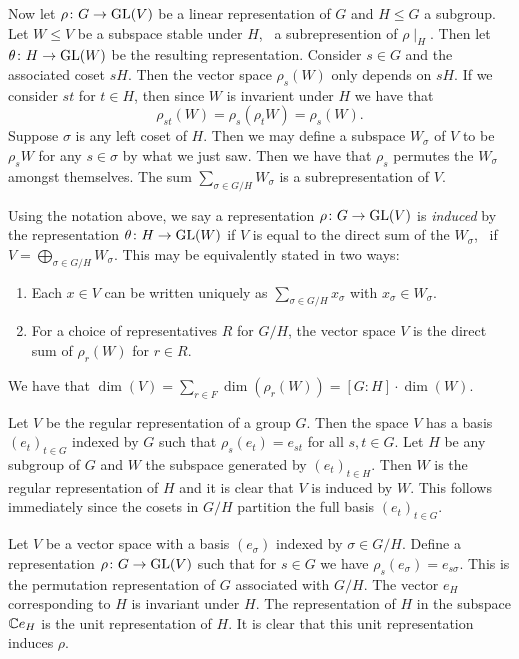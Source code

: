 \documentclass[letterpaper, 11pt, oneside]{book}
\begin{document}
Now let $\rho\colon G \to \operatorname{GL}(V)$ be a linear representation of $G$ and $H \leq G$ a subgroup.
Let $W \leq V$ be a subspace stable under $H$, \ie\ a subrepresention of $\rho\mid_{H}$.
Then let $\theta\colon H \to \operatorname{GL}(W)$ be the resulting representation.
Consider $s \in G$ and the associated coset $sH$.
Then the vector space $\rho_{s}(W)$ only depends on $sH$.
If we consider $st$ for $t \in H$, then since $W$ is invarient under $H$ we have that
\[
  \rho_{st}(W) = \rho_{s}(\rho_{t}W) = \rho_{s}(W).
\]
Suppose $\sigma$ is any left coset of $H$.
Then we may define a subspace $W_{\sigma}$ of $V$ to be $\rho_{s}W$ for any $s \in \sigma$ by what we just saw.
Then we have that $\rho_{s}$ permutes the $W_{\sigma}$ amongst themselves.
The sum $\sum_{\sigma \in G/H} W_{\sigma}$ is a subrepresentation of $V$.

\begin{defn}
  Using the notation above, we say a representation $\rho\colon G \to \operatorname{GL}(V)$ is \emph{induced} by the representation $\theta\colon H \to \operatorname{GL}(W)$ if $V$ is equal to the direct sum of the $W_{\sigma}$, \ie\ if $V = \bigoplus_{\sigma \in G/H} W_{\sigma}$.
  This may be equivalently stated in two ways:
  \begin{enumerate}
  \item Each $x \in V$ can be written uniquely as $\sum_{\sigma \in G/H} x_{\sigma}$ with $x_{\sigma} \in W_{\sigma}$.
  \item For a choice of representatives $R$ for $G/H$, the vector space $V$ is the direct sum of $\rho_{r}(W)$ for $r \in R$.
  \end{enumerate}
  We have that $\dim(V) = \sum_{r \in F} \dim(\rho_{r}(W)) = [G \colon H] \cdot \dim(W)$.
\end{defn}

\begin{ex}\label{ex:any_subgrp_induce_reg_rep}
  Let $V$ be the regular representation of a group $G$.
  Then the space $V$ has a basis $(e_{t})_{t \in G}$ indexed by $G$ such that $\rho_{s}(e_{t}) = e_{st}$ for all $s, t \in G$.
  Let $H$ be any subgroup of $G$ and $W$ the subspace generated by $(e_{t})_{t \in H}$.
  Then $W$ is the regular representation of $H$ and it is clear that $V$ is induced by $W$.
  This follows immediately since the cosets in $G / H$ partition the full basis $(e_{t})_{t \in G}$.
\end{ex}

\begin{ex}
  Let $V$ be a vector space with a basis $(e_{\sigma})$ indexed by $\sigma \in G / H$.
  Define a representation $\rho\colon G \to \operatorname{GL}(V)$ such that for $s \in G$ we have $\rho_{s}(e_{\sigma}) = e_{s\sigma}$.
  This is the permutation representation of $G$ associated with $G / H$.
  The vector $e_{H}$ corresponding to $H$ is invariant under $H$.
  The representation of $H$ in the subspace $\mathbb{C} e_{H}$ is the unit representation of $H$.
  It is clear that this unit representation induces $\rho$.
\end{ex}
\end{document}
